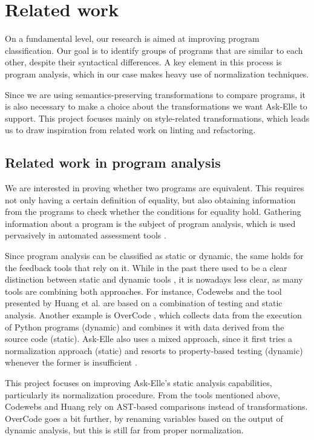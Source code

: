 \chapter{Related work}
\label{sec:related-work}

On a fundamental level, our research is aimed at improving program classification. Our goal is to identify groups of programs that are similar to each other, despite their syntactical differences. A key element in this process is program analysis, which in our case makes heavy use of normalization techniques.

Since we are using semantics-preserving transformations to compare programs, it is also necessary to make a choice about the transformations we want Ask-Elle to support. This project focuses mainly on style-related transformations, which leads us to draw inspiration from related work on linting and refactoring.

\section{Related work in program analysis}

We are interested in proving whether two programs are equivalent. This requires not only having a certain definition of equality, but also obtaining information from the programs to check whether the conditions for equality hold. Gathering information about a program is the subject of program analysis, which is used pervasively in automated assessment tools  \cite{2005alasurvey}.

Since program analysis can be classified as static or dynamic, the same holds for the feedback tools that rely on it. While in the past there used to be a clear distinction between static and dynamic tools \cite{2016feedbackreview}, it is nowadays less clear, as many tools are combining both approaches. For instance, Codewebs \cite{2014codewebs} and the tool presented by Huang et al. \cite{2013huang} are based on a combination of testing and static analysis. Another example is OverCode \cite{2015overcode}, which collects data from the execution of Python programs (dynamic) and combines it with data derived from the source code (static). Ask-Elle also uses a mixed approach, since it first tries a normalization approach (static) and resorts to property-based testing (dynamic) whenever the former is insufficient \cite{2017askelle}.

This project focuses on improving Ask-Elle's static analysis capabilities, particularly its normalization procedure. From the tools mentioned above, Codewebs and Huang rely on AST-based comparisons instead of transformations. OverCode goes a bit further, by renaming variables based on the output of dynamic analysis, but this is still far from proper normalization.

